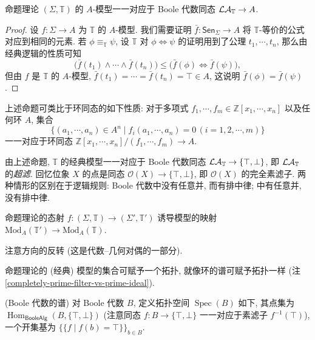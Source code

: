 \begin{prop}
	[label={model-boolealg-homomorphism}]
	{}
	命题理论 $(\Sigma,\mathbb T)$ 的 $A$-模型一一对应于 Boole 代数同态 $\mathcal {LA}_{\mathbb T} \to A$.
\end{prop}

\begin{proof}
	设 $f\colon \Sigma\to A$ 为 $\mathbb T$ 的 $A$-模型. 我们需要证明 $\bar f\colon \mathsf {Sen}_\Sigma\to A$ 将 $\mathbb T$-等价的公式对应到相同的元素. 若 $\phi \equiv_{\mathbb T} \psi$, 设 $\mathbb T$ 对 $\phi \Leftrightarrow\psi$ 的证明用到了公理 $t_1,\cdots,t_n$, 那么由经典逻辑的性质可知
	$$
	\big( \bar f(t_1) \land \cdots \land \bar f (t_n) \big) \leq \big( \bar f(\phi) \Leftrightarrow \bar f(\psi) \big),
	$$
	但由 $f$ 是 $\mathbb T$ 的 $A$-模型, $\bar f(t_1)=\cdots = \bar f(t_n) = \top\in A$, 这说明 $\bar f(\phi) = \bar f(\psi)$.
\end{proof}

\begin{remark}
	{}
	上述命题可类比于环同态的如下性质:
	对于多项式 $f_1,\cdots,f_m\in \mathbb{Z}[x_1,\cdots,x_n]$ 以及任何环 $A$, 集合
	$$
	\big\{
	(a_1,\cdots,a_n)\in A^n\mid f_i(a_1,\cdots,a_n)=0\,(i=1,2,\cdots,m)
	\big\}
	$$
	一一对应于环同态 $\mathbb{Z}[x_1,\cdots,x_n]/(f_1,\cdots,f_m) \to A$.
\end{remark}

\begin{remark}
	[label={model-and-ultrafilter}]
	{}
	由上述命题, $\mathbb T$ 的经典模型一一对应于 Boole 代数同态 $\mathcal {LA}_{\mathbb T} \to \{\top,\bot\}$, 即 $\mathcal {LA}_{\mathbb T}$ 的\emph{超滤}.
	回忆位象 $X$ 的点是\fm{}同态 $\mathcal O(X) \to \{\top,\bot\}$, 即 $\mathcal O(X)$ 的完全素滤子. 两种情形的区别在于逻辑规则: Boole 代数中没有任意并, 而有排中律; \fm{}中有任意并, 没有排中律.
\end{remark}

\begin{prop}
	{}
	命题理论的态射 $f\colon (\Sigma,\mathbb T) \to (\Sigma',\mathbb T')$ 诱导模型的映射 $\text{Mod}_A(\mathbb T') \to \text{Mod}_A(\mathbb T)$.
\end{prop}

注意方向的反转 (这是代数--几何对偶的一部分).

命题理论的 (经典) 模型的集合可赋予一个拓扑, 就像环的谱可赋予拓扑一样 (注 \ref{completely-prime-filter-vs-prime-ideal}).

\begin{definition}
	{(Boole 代数的谱)}
	对 Boole 代数 $B$, 定义拓扑空间 $\operatorname{Spec}(B)$ 如下, 其点集为 $\operatorname{Hom}_{\mathsf {BooleAlg}}(B,\{\top,\bot\})$ (注意同态 $f\colon B\to\{\top,\bot\}$ 一一对应于素滤子 $f^{-1}(\top)$), 一个开集基为 $\big\{\{f\mid f(b)=\top\}\big\}_{b\in B}$.
\end{definition}

